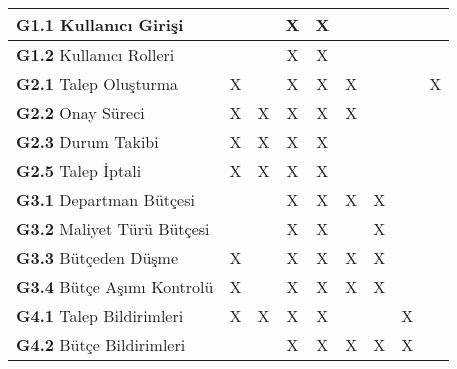 \documentclass{article}
\begin{document}
\begin{footnotesize}
\begin{longtable}{|l| *{8}{c|}}
\textbf{G1.1} Kullanıcı Girişi & & & X & X & & & & \\ \hline
\textbf{G1.2} Kullanıcı Rolleri & & & X & X & & & & \\ \hline
\textbf{G2.1} Talep Oluşturma & X & & X & X & X & & & X \\ \hline
\textbf{G2.2} Onay Süreci & X & X & X & X & X & & & \\ \hline
\textbf{G2.3} Durum Takibi & X & X & X & X & & & & \\ \hline
\textbf{G2.5} Talep İptali & X & X & X & X & & & & \\ \hline
\textbf{G3.1} Departman Bütçesi & & & X & X & X & X & & \\ \hline
\textbf{G3.2} Maliyet Türü Bütçesi & & & X & X & & X & & \\ \hline
\textbf{G3.3} Bütçeden Düşme & X & & X & X & X & X & & \\ \hline
\textbf{G3.4} Bütçe Aşımı Kontrolü & X & & X & X & X & X & & \\ \hline
\textbf{G4.1} Talep Bildirimleri & X & X & X & X & & & X & \\ \hline
\textbf{G4.2} Bütçe Bildirimleri & & & X & X & X & X & X & \\ \hline
\end{longtable}
\end{footnotesize}
\end{document}

